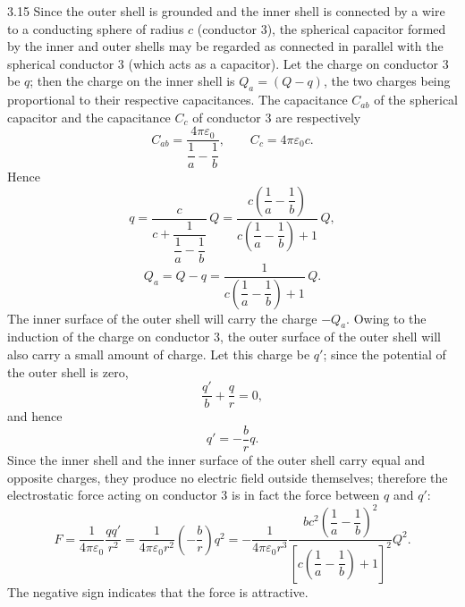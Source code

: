 \begin{solution}{3.15}
Since the outer shell is grounded and the inner shell is connected by a wire to a conducting sphere of radius $c$ (conductor 3), the spherical capacitor formed by the inner and outer shells may be regarded as connected in parallel with the spherical conductor 3 (which acts as a capacitor). Let the charge on conductor 3 be $q$; then the charge on the inner shell is $Q_a=(Q-q)$, the two charges being proportional to their respective capacitances. The capacitance $C_{ab}$ of the spherical capacitor and the capacitance $C_c$ of conductor 3 are respectively
\[
C_{ab}=\frac{4\pi\varepsilon_0}{\dfrac{1}{a}-\dfrac{1}{b}},\qquad
C_c=4\pi\varepsilon_0c.
\]
Hence
\[
q=\frac{c}{c+\dfrac{1}{\dfrac{1}{a}-\dfrac{1}{b}}}\,Q
=\frac{c\left(\dfrac{1}{a}-\dfrac{1}{b}\right)}{c\left(\dfrac{1}{a}-\dfrac{1}{b}\right)+1}\,Q,
\]
\[
Q_a=Q-q=\frac{1}{c\left(\dfrac{1}{a}-\dfrac{1}{b}\right)+1}\,Q.
\]
The inner surface of the outer shell will carry the charge $-Q_a$. Owing to the induction of the charge on conductor 3, the outer surface of the outer shell will also carry a small amount of charge. Let this charge be $q'$; since the potential of the outer shell is zero,
\[
\frac{q'}{b}+\frac{q}{r}=0,
\]
and hence
\[
q'=-\frac{b}{r}q.
\]
Since the inner shell and the inner surface of the outer shell carry equal and opposite charges, they produce no electric field outside themselves; therefore the electrostatic force acting on conductor 3 is in fact the force between $q$ and $q'$:
\[
F=\frac{1}{4\pi\varepsilon_0}\frac{qq'}{r^2}
=\frac{1}{4\pi\varepsilon_0r^2}\left(-\frac{b}{r}\right)q^2
=-\frac{1}{4\pi\varepsilon_0r^3}
\frac{bc^2\left(\dfrac{1}{a}-\dfrac{1}{b}\right)^2}
{\left[c\left(\dfrac{1}{a}-\dfrac{1}{b}\right)+1\right]^2}Q^2.
\]
The negative sign indicates that the force is attractive.
\end{solution}

